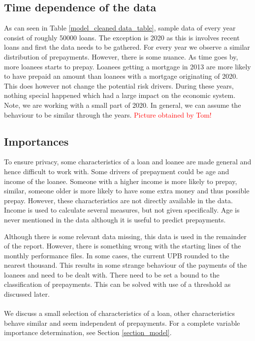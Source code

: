 \subsection{Time dependence of the data}
    As can seen in Table \ref{model_cleaned data_table}, sample data of every year consist of roughly 50000 loans. The exception is 2020 as this is involves recent loans and first the data needs to be gathered. For every year we observe a similar distribution of prepayments. However, there is some nuance. As time goes by, more loanees starts to prepay. Loanees getting a mortgage in 2013 are more likely to have prepaid an amount than loanees with a mortgage originating of 2020. This does however not change the potential risk drivers. During these years, nothing special happened which had a large impact on the economic system. Note, we are working with a small part of 2020. In general, we can assume the behaviour to be similar through the years.
    \textcolor{red}{Picture obtained by Tom!}

\subsection{Importances}
    To ensure privacy, some characteristics of a loan and loanee are made general and hence difficult to work with. Some drivers of prepayment could be age and income of the loanee. Someone with a higher income is more likely to prepay, similar, someone older is more likely to have some extra money and thus possible prepay. However, these characteristics are not directly available in the data. Income is used to calculate several measures, but not given specifically. Age is never mentioned in the data although it is useful to predict prepayments.  

    Although there is some relevant data missing, this data is used in the remainder of the report.  However, there is something wrong with the starting lines of the monthly performance files. In some cases, the current UPB rounded to the nearest thousand. This results in some strange behaviour of the payments of the loanees and need to be dealt with. There need to be set a bound to the classification of prepayments. This can be solved with use of a threshold as discussed later. 
    \\\\
    We discuss a small selection of characteristics of a loan, other characteristics behave similar and seem independent of prepayments. For a complete variable importance determination, see Section \ref{section_model}. 
    
